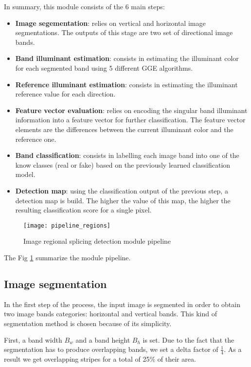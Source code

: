 In summary, this module consists of the 6 main steps:

\begin{itemize}
\item \textbf{Image segementation}: relies on vertical and horizontal image segmentations. The outputs of this stage are two set of directional image bands. 
\item \textbf{Band illuminant estimation}: consists in estimating the illuminant color for each segmented band using 5 different GGE algorithms.
\item \textbf{Reference illuminant estimation}: consists in estimating the illuminant reference value for each direction.
\item \textbf{Feature vector evaluation}: relies on encoding the singular band illuminant information into a feature vector for further classification. The feature vector elements are the differences between the current illuminant color and the reference one.
\item \textbf{Band classification}: consists in labelling each image band into one of the know classes (real or fake) based on the previously learned classification model.
\item \textbf{Detection map}: using the classification output of the previous step, a detection map is build. The higher the value of this map, the higher the  resulting classification score for a single pixel.
\end{itemize}

\begin{figure}[h!]
  \centering
    \texttt{[image: pipeline\_regions]}
    \caption{Image regional splicing detection module pipeline}
    \label{fig:regionsmodulepipeline}
\end{figure}

The Fig \ref{fig:regionsmodulepipeline} summarize the module pipeline.

\subsection{Image segmentation}

In the first step of the process, the input image is segmented in order to obtain two image bands categories: horizontal and vertical bands. This kind of segmentation method is chosen because of its simplicity.

First, a band width $B_w$ and a band height $B_h$ is set. Due to the fact that the segmentation has to produce overlapping bands, we set a delta factor of $\frac{1}{4}$. As a result we get overlapping stripes for a total of 25\% of their area. 

